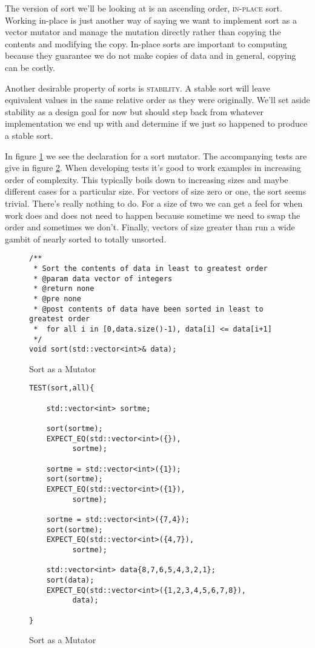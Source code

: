 \documentclass[]{tufte-handout}
\begin{document}
The version of sort we'll be looking at is an ascending order, \textsc{in-place} sort. Working in-place is just another way of saying we want to implement sort as a vector mutator and manage the mutation directly rather than copying the contents and modifying the copy. In-place sorts are important to computing because they guarantee we do not make copies of data and in general, copying can be costly.

Another desirable property of sorts is \textsc{stability}. A stable sort will leave equivalent values in the same relative order as they were originally. We'll set aside stability as a design goal for now but should step back from whatever implementation we end up with and determine if we just so happened to produce a stable sort.

In figure \ref{code:sortdecl} we see the declaration for a sort mutator. The accompanying tests are give in figure \ref{code:sorttests}. When developing tests it's good to work examples in increasing order of complexity. This typically boils down to increasing sizes and maybe different cases for a particular size. For vectors of size zero or one, the sort seems trivial. There's really nothing to do. For a size of two we can get a feel for when work does and does not need to happen because sometime we need to swap the order and sometimes we don't. Finally, vectors of size greater than run a wide gambit of nearly sorted to totally unsorted.

\begin{figure}[htbp!]
\begin{lstlisting}
/**
 * Sort the contents of data in least to greatest order
 * @param data vector of integers
 * @return none
 * @pre none
 * @post contents of data have been sorted in least to greatest order
 *  for all i in [0,data.size()-1), data[i] <= data[i+1]
 */
void sort(std::vector<int>& data);
\end{lstlisting}
\label{code:sortdecl}
\caption{Sort as a Mutator}
\end{figure}

\begin{figure}[htbp!]
\begin{lstlisting}
TEST(sort,all){

	std::vector<int> sortme;

 	sort(sortme);
    EXPECT_EQ(std::vector<int>({}),
	      sortme);

    sortme = std::vector<int>({1});
	sort(sortme);
    EXPECT_EQ(std::vector<int>({1}),
	      sortme);

    sortme = std::vector<int>({7,4});
	sort(sortme);
    EXPECT_EQ(std::vector<int>({4,7}),
	      sortme);

    std::vector<int> data{8,7,6,5,4,3,2,1};
	sort(data);
    EXPECT_EQ(std::vector<int>({1,2,3,4,5,6,7,8}),
	      data);

}
\end{lstlisting}
\label{code:sorttests}
\caption{Sort as a Mutator}
\end{figure}
\end{document}
